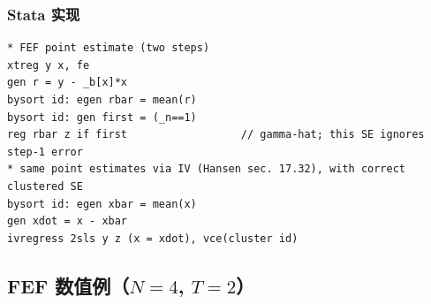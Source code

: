 \subsubsection{Stata 实现}

\begin{lstlisting}
* FEF point estimate (two steps)
xtreg y x, fe
gen r = y - _b[x]*x
bysort id: egen rbar = mean(r)
bysort id: gen first = (_n==1)
reg rbar z if first                  // gamma-hat; this SE ignores step-1 error
* same point estimates via IV (Hansen sec. 17.32), with correct clustered SE
bysort id: egen xbar = mean(x)
gen xdot = x - xbar
ivregress 2sls y z (x = xdot), vce(cluster id)
\end{lstlisting}

\subsection{FEF 数值例（\texorpdfstring{$N=4$, $T=2$}{N=4, T=2}）}

